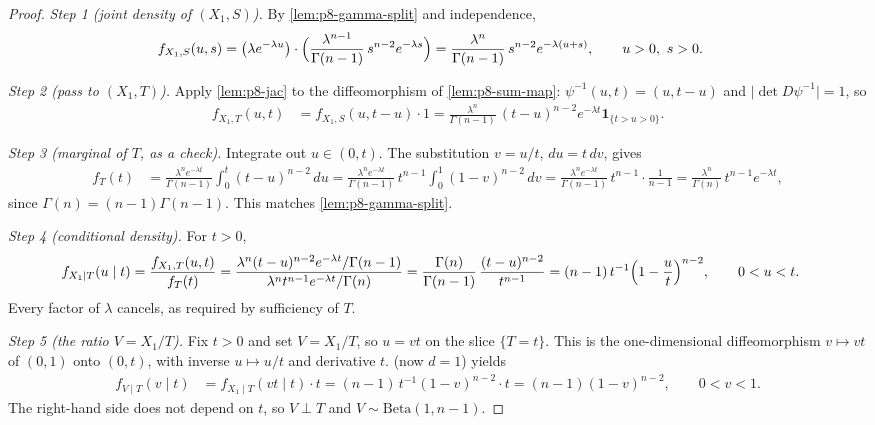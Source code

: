 \documentclass[11pt,a4paper]{article}
\begin{document}
\begin{proof}
\textit{Step 1 (joint density of \((X_1,S)\)).}
By \cref{lem:p8-gamma-split} and independence,
\begin{align*}
f_{X_1,S}(u,s)
&=
\bigl(\lambda e^{-\lambda u}\bigr)
\cdot
\Bigl(\frac{\lambda^{n-1}}{\Gamma(n-1)}\,s^{n-2}e^{-\lambda s}\Bigr)
=
\frac{\lambda^n}{\Gamma(n-1)}\,s^{n-2}e^{-\lambda(u+s)},
\qquad
u>0,\ s>0.
\end{align*}

\textit{Step 2 (pass to \((X_1,T)\)).}
Apply \cref{lem:p8-jac} to the diffeomorphism of \cref{lem:p8-sum-map}: \(\psi^{-1}(u,t)=(u,t-u)\) and \(\lvert\det D\psi^{-1}\rvert=1\), so
\begin{align*}
f_{X_1,T}(u,t)
&=
f_{X_1,S}(u,t-u)\cdot 1
=
\frac{\lambda^n}{\Gamma(n-1)}\,(t-u)^{n-2}e^{-\lambda t}
\mathbf{1}_{\{t>u>0\}}.
\end{align*}

\textit{Step 3 (marginal of \(T\), as a check).}
Integrate out \(u\in(0,t)\). The substitution \(v=u/t\), \(du=t\,dv\), gives
\begin{align*}
f_T(t)
&=
\frac{\lambda^n e^{-\lambda t}}{\Gamma(n-1)}
\int_0^t(t-u)^{n-2}\,du
=
\frac{\lambda^n e^{-\lambda t}}{\Gamma(n-1)}\,t^{n-1}
\int_0^1(1-v)^{n-2}\,dv
=
\frac{\lambda^n e^{-\lambda t}}{\Gamma(n-1)}\,t^{n-1}\cdot\frac{1}{n-1}
=
\frac{\lambda^n}{\Gamma(n)}\,t^{n-1}e^{-\lambda t},
\end{align*}
since \(\Gamma(n)=(n-1)\Gamma(n-1)\). This matches \cref{lem:p8-gamma-split}.

\textit{Step 4 (conditional density).}
For \(t>0\),
\begin{align*}
f_{X_1\mid T}(u\mid t)
&=
\frac{f_{X_1,T}(u,t)}{f_T(t)}
=
\frac{\lambda^n(t-u)^{n-2}e^{-\lambda t}/\Gamma(n-1)}{\lambda^n t^{n-1}e^{-\lambda t}/\Gamma(n)}
=
\frac{\Gamma(n)}{\Gamma(n-1)}\,\frac{(t-u)^{n-2}}{t^{n-1}}
=
(n-1)\,t^{-1}\Bigl(1-\frac{u}{t}\Bigr)^{n-2},
\qquad
0<u<t.
\end{align*}
Every factor of \(\lambda\) cancels, as required by sufficiency of \(T\).

\textit{Step 5 (the ratio \(V=X_1/T\)).}
Fix \(t>0\) and set \(V=X_1/T\), so \(u=vt\) on the slice \(\{T=t\}\). This is the one-dimensional diffeomorphism \(v\mapsto vt\) of \((0,1)\) onto \((0,t)\), with inverse \(u\mapsto u/t\) and derivative \(t\).  (now \(d=1\)) yields
\begin{align*}
f_{V\mid T}(v\mid t)
&=
f_{X_1\mid T}(vt\mid t)\cdot t
=
(n-1)\,t^{-1}(1-v)^{n-2}\cdot t
=
(n-1)(1-v)^{n-2},
\qquad
0<v<1.
\end{align*}
The right-hand side does not depend on \(t\), so \(V\perp T\) and \(V\sim\mathrm{Beta}(1,n-1)\).
\end{proof}
\end{document}
